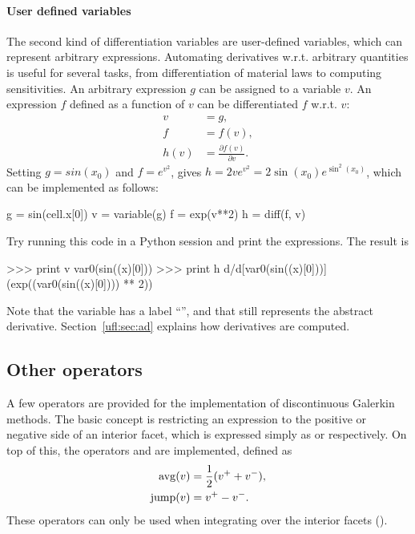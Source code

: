 \paragraph{User defined variables}
\label{ufl:sec:diff}

The second kind of differentiation variables are user-defined
variables, which can represent arbitrary expressions.  Automating
derivatives w.r.t. arbitrary quantities is useful for several tasks, from
differentiation of material laws to computing sensitivities.  An arbitrary
expression $g$ can be assigned to a variable $v$.  An expression $f$
defined as a function of $v$ can be differentiated $f$ w.r.t. $v$:
\begin{align}
v &= g, \\
f &= f(v), \\
h(v) &= \frac{\partial f(v)}{\partial v}.
\end{align}
Setting $g = sin(x_0)$ and $f = e^{v^2}$, gives $h = 2 v e^{v^2} =
2 \sin(x_0) e^{\sin^2(x_0)}$, which can be implemented as follows:\vspace*{-2pt}
\begin{uflcode}
g = sin(cell.x[0])
v = variable(g)
f = exp(v**2)
h = diff(f, v)
\end{uflcode}
Try running this code in a Python session and print the expressions.
The result is\vspace*{-2pt}
\begin{python}
>>> print v
var0(sin((x)[0]))
>>> print h
d/d[var0(sin((x)[0]))] (exp((var0(sin((x)[0]))) ** 2))
\end{python}
Note that the variable has a label ``'', and that 
still represents the abstract derivative.  Section~\ref{ufl:sec:ad}
explains how derivatives are computed.

\subsection{Other operators}
\label{ufl:sec:conditionals}

A few operators are provided for the implementation of discontinuous
Galerkin methods.  The basic concept is restricting an expression to
the positive or negative side of an interior facet, which is expressed
simply as  or  respectively. On top of
this, the operators  and  are implemented,
defined as\enlargethispage{6pt}
\begin{align}
\operatorname{avg}(v)  &= \frac 1 2 (v^+ + v^-), \\
\operatorname{jump}(v) &= v^+ - v^- .
\end{align}
These operators can only be used when integrating over the interior facets
().

